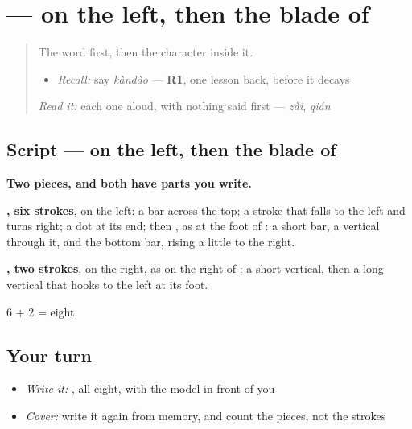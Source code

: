 \section[\texorpdfstring{\zh{到} (dào)}{到 (dào)}]{ —  on the left, then the blade of }

\label{lesson:ZH-W151-dao-arrive}



\begin{quote}
The word first, then the character inside it.

\begin{itemize}
\raggedright
  \item \emph{Recall:} say \emph{kàndào} — \textbf{R1}, one lesson back, before it decays
\end{itemize}

\begin{quote}
 
\end{quote}

\emph{Read it:} each one aloud, with nothing said first — \emph{zài}, \emph{qián}
\end{quote}

\subsection*{Script —  on the left, then the blade of }

\begin{quote}
\end{quote}

\textbf{Two pieces, and both have parts you write.}

\textbf{, six strokes}, on the left: a bar across the top; a stroke that falls to the left and turns right; a dot at its end; then , as at the foot of : a short bar, a vertical through it, and the bottom bar, rising a little to the right.

\textbf{, two strokes}, on the right, as on the right of : a short vertical, then a long vertical that hooks to the left at its foot.

6 + 2 = eight.

\subsection*{Your turn}
\begin{itemize}
\raggedright
  \item \emph{Write it:} , all eight, with the model in front of you
  \item \emph{Cover:} write it again from memory, and count the pieces, not the strokes
\end{itemize}


